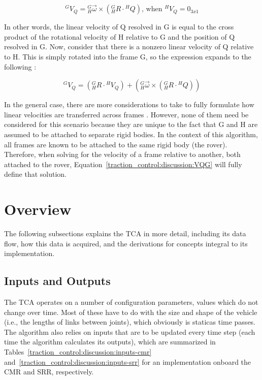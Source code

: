 \begin{equation}
	{}^{G}V_{Q} = {}^{G}_{H}\vec{\omega} \times \left({}^{G}_{H}R \cdot {}^{H}Q\right) \text{, when } {}^{H}V_{Q} = 0_{3x1}
\end{equation}

In other words, the linear velocity of Q resolved in G is equal to the cross product of the rotational velocity of H relative to G and the position of Q resolved in G. Now, consider that there is a nonzero linear velocity of Q relative to H. This is simply rotated into the frame G, so the expression expands to the following \cite{craig}:

\begin{equation}\label{traction_control:discussion:VQG}
	{}^{G}V_{Q} = \left({}^{G}_{H}R \cdot {}^{H}V_{Q}\right) + \left({}^{G}_{H}\vec{\omega} \times \left({}^{G}_{H}R \cdot {}^{H}Q\right)\right)
\end{equation}

In the general case, there are more considerations to take to fully formulate how linear velocities are transferred across frames \cite{craig}. However, none of them need be considered for this scenario because they are unique to the fact that G and H are assumed to be attached to separate rigid bodies. In the context of this algorithm, all frames are known to be attached to the same rigid body (the rover). Therefore, when solving for the velocity of a frame relative to another, both attached to the rover, Equation~\ref{traction_control:discussion:VQG} will fully define that solution.

\acresetall
\section{Overview}
The following subsections explains the \ac{TCA} in more detail, including its data flow, how this data is acquired, and the derivations for concepts integral to its implementation.

\subsection{Inputs and Outputs}
The \ac{TCA} operates on a number of configuration parameters, values which do not change over time. Most of these have to do with the size and shape of the vehicle (i.e., the lengths of links between joints), which obviously is staticas time passes. The algorithm also relies on inputs that are to be updated every time step (each time the algorithm calculates its outputs), which are summarized in Tables~\ref{traction_control:discussion:inputs-cmr} and~\ref{traction_control:discussion:inputs-srr} for an implementation onboard the \ac{CMR} and \ac{SRR}, respectively.

